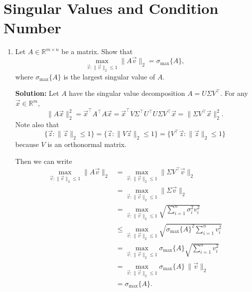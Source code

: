 \documentclass[10pt]{article}
\theoremstyle{definition}
\theoremstyle{plain}
\newcommand{\RR}{\mathbb{R}}
\begin{document}
\newpage

\section{Singular Values and Condition Number}

\begin{enumerate}[label=(\alph*)]
\item Let $A \in \RR^{m \times n}$ be a matrix. Show that
\begin{equation}
\max_{\vec{v}:\|\vec{v}\|_2 \le 1} \|A\vec{v}\|_2 = \sigma_{\max}\{A\},
\end{equation}
where $\sigma_{\max}\{A\}$ is the largest singular value of $A$.

\textbf{Solution:} Let $A$ have the singular value decomposition $A = U\Sigma V^\top$. For any $\vec{x} \in \RR^m$,
\begin{equation}
\|A\vec{x}\|_2^2 = \vec{x}^\top A^\top A \vec{x} = \vec{x}^\top V\Sigma^\top U^\top U\Sigma V^\top \vec{x} = \|\Sigma V^\top \vec{x}\|_2^2.
\end{equation}
Note also that
\begin{equation}
\{\vec{z} : \|\vec{z}\|_2 \le 1\} = \{\vec{z} : \|V\vec{z}\|_2 \le 1\} = \{V^\top \vec{z} : \|\vec{z}\|_2 \le 1\}
\end{equation}
because $V$ is an orthonormal matrix.

Then we can write
\begin{align}
\max_{\vec{v}:\|\vec{v}\|_2 \le 1} \|A\vec{v}\|_2 &= \max_{\vec{v}:\|\vec{v}\|_2 \le 1} \|\Sigma V^\top \vec{v}\|_2 \\
&= \max_{\vec{v}:\|\vec{v}\|_2 \le 1} \|\Sigma \vec{v}\|_2 \\
&= \max_{\vec{v}:\|\vec{v}\|_2 \le 1} \sqrt{\sum_{i=1}^{n} \sigma_i^2 v_i^2} \\
&\le \max_{\vec{v}:\|\vec{v}\|_2 \le 1} \sqrt{\sigma_{\max}\{A\}^2 \sum_{i=1}^{n} v_i^2} \\
&= \max_{\vec{v}:\|\vec{v}\|_2 \le 1} \sigma_{\max}\{A\} \sqrt{\sum_{i=1}^{n} v_i^2} \\
&= \max_{\vec{v}:\|\vec{v}\|_2 \le 1} \sigma_{\max}\{A\} \, \|\vec{v}\|_2 \\
&= \sigma_{\max}\{A\}.
\end{align}


\end{enumerate}
\end{document}
